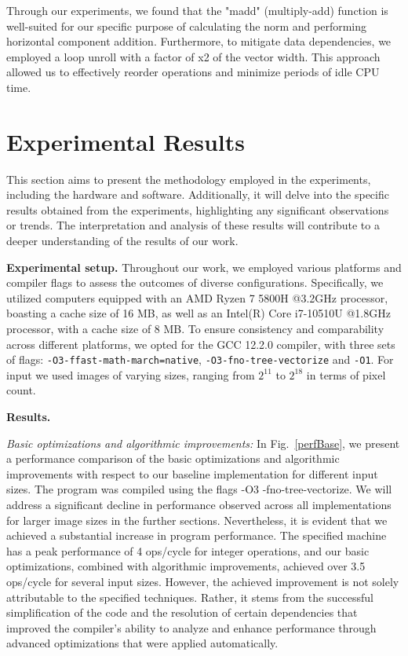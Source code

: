 \documentclass[letterpaper]{article}
\newcommand{\mypar}[1]{{\bf #1.}}
\newcommand{\inline}[1]{{\ttfamily\hyphenchar\font=45 #1}}
\begin{document}
Through our experiments, we found that the "madd" (multiply-add) function is well-suited for our specific purpose of calculating the norm and performing horizontal component addition.
Furthermore, to mitigate data dependencies, we employed a loop unroll with a factor of x2 of the vector width. This approach allowed us to effectively reorder operations and minimize periods of idle CPU time. 

\section{Experimental Results}\label{sec:exp}

This section aims to present the methodology employed in the experiments, including the hardware and software. Additionally, it will delve into the specific results obtained from the experiments, highlighting any significant observations or trends. The interpretation and analysis of these results will contribute to a deeper understanding of the results of our work.

\mypar{Experimental setup} 
Throughout our work, we employed various platforms and compiler flags to assess the outcomes of diverse configurations. Specifically, we utilized computers equipped with an AMD Ryzen 7 5800H @3.2GHz processor, boasting a cache size of 16 MB, as well as an Intel(R) Core i7-10510U @1.8GHz processor, with a cache size of 8 MB. To ensure consistency and comparability across different platforms, we opted for the GCC 12.2.0 compiler, with three sets of flags: \texttt{-O3-ffast-math-march=native}, \texttt{-O3-fno-tree-vectorize} and \texttt{-O1}.
For input we used images of varying sizes, ranging from $2^{11}$ to $2^{18}$ in terms of pixel count.

\mypar{Results}

\textit{Basic optimizations and algorithmic improvements:} In Fig.~\ref{perfBase}, we present a performance comparison of the basic optimizations and algorithmic improvements with respect to our baseline implementation for different input sizes. The program was compiled using the flags \inline{-O3 -fno-tree-vectorize}. We will address a significant decline in performance observed across all implementations for larger image sizes in the further sections. Nevertheless, it is evident that we achieved a substantial increase in program performance. The specified machine has a peak performance of 4 ops/cycle for integer operations, and our basic optimizations, combined with algorithmic improvements, achieved over 3.5 ops/cycle for several input sizes. However, the achieved improvement is not solely attributable to the specified techniques. Rather, it stems from the successful simplification of the code and the resolution of certain dependencies that improved the compiler’s ability to analyze and enhance performance through advanced optimizations that were applied automatically.
\end{document}
